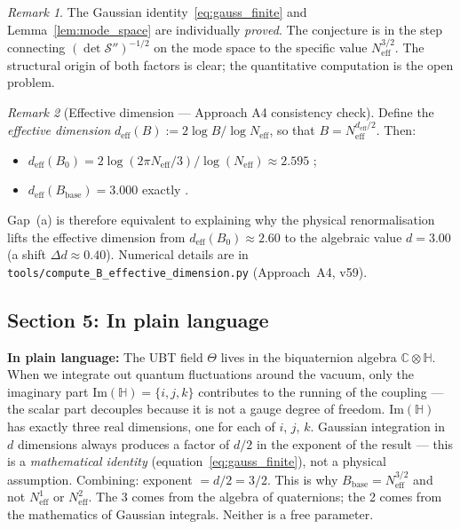 \documentclass[11pt,a4paper]{article}
\theoremstyle{definition}
\theoremstyle{remark}
\newtheorem{remark}{Remark}
\begin{document}
\begin{remark}
  The Gaussian identity~\eqref{eq:gauss_finite} and
  Lemma~\ref{lem:mode_space} are individually \emph{proved}.
  The conjecture is in the step connecting $(\det \mathcal{S}'')^{-1/2}$
  on the mode space to the specific value $N_{\mathrm{eff}}^{3/2}$.
  The structural origin of both factors is clear; the quantitative computation
  is the open problem.
\end{remark}

\begin{remark}[Effective dimension — Approach A4 consistency check]
  \label{rem:d_eff}
  Define the \emph{effective dimension} $d_{\mathrm{eff}}(B) := 2\log B / \log N_{\mathrm{eff}}$,
  so that $B = N_{\mathrm{eff}}^{d_{\mathrm{eff}}/2}$.  Then:
  \begin{itemize}
    \item $d_{\mathrm{eff}}(B_0) = 2\log(2\pi N_{\mathrm{eff}}/3)/\log(N_{\mathrm{eff}}) \approx 2.595$
      ;
    \item $d_{\mathrm{eff}}(B_{\mathrm{base}}) = 3.000$ exactly \quad
      [integer = $\dim_\mathbb{R}(\mathrm{Im}\,\mathbb{H})$, algebraic identity].
  \end{itemize}
  Gap~(a) is therefore equivalent to explaining why the physical renormalisation
  lifts the effective dimension from $d_{\mathrm{eff}}(B_0) \approx 2.60$ to
  the algebraic value $d = 3.00$ (a shift $\Delta d \approx 0.40$).
  Numerical details are in \texttt{tools/compute\_B\_effective\_dimension.py}
  (Approach~A4, v59).
\end{remark}

\subsection{Section 5: In plain language}
\label{sec:plain}

\textbf{In plain language:}
The UBT field $\Theta$ lives in the biquaternion algebra $\mathbb{C}\otimes\mathbb{H}$.
When we integrate out quantum fluctuations around the vacuum,
only the imaginary part $\mathrm{Im}(\mathbb{H}) = \{i, j, k\}$ contributes to
the running of the coupling — the scalar part decouples because it is not a
gauge degree of freedom.
$\mathrm{Im}(\mathbb{H})$ has exactly three real dimensions, one for each of $i$, $j$, $k$.
Gaussian integration in $d$ dimensions always produces a factor of $d/2$ in the
exponent of the result — this is a \emph{mathematical identity}
(equation~\eqref{eq:gauss_finite}), not a physical assumption.
Combining: exponent $= d/2 = 3/2$.
This is why $B_{\mathrm{base}} = N_{\mathrm{eff}}^{3/2}$ and not $N_{\mathrm{eff}}^1$
or $N_{\mathrm{eff}}^2$.
The 3 comes from the algebra of quaternions; the 2 comes from the mathematics of
Gaussian integrals.
Neither is a free parameter.

\ifdefined\INCLUDEMODE\else
\end{document}
